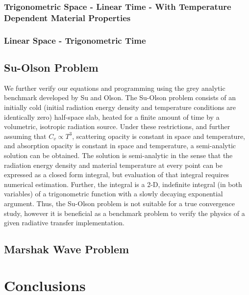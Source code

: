 \subsubsection{Trigonometric Space - Linear Time - With Temperature Dependent Material Properties}

\subsubsection{Linear Space - Trigonometric Time}

\subsection{Su-Olson Problem}

We further verify our equations and programming using the grey analytic benchmark developed by Su and Olson\cite{su_olson_1}.
The Su-Olson problem consists of an initially cold (initial radiation energy density and temperature conditions are identically zero) half-space slab, heated for a finite amount of time by a volumetric, isotropic radiation source.
Under these restrictions, and further assuming that $C_v \propto T^3$, scattering opacity is constant in space and temperature, and absorption opacity is constant in space and temperature, a semi-analytic solution can be obtained.
The solution is semi-analytic in the sense that the radiation energy density and material temperature at every point can be expressed as a closed form integral, but evaluation of that integral requires numerical estimation.
Further, the integral is a 2-D, indefinite integral (in both variables) of a trigonometric function with a slowly  decaying exponential argument.
Thus, the Su-Olson problem is not suitable for a true convergence study, however it is beneficial as a benchmark problem to verify the physics of a given radiative transfer implementation.

\subsection{Marshak Wave Problem}


\section{Conclusions}
\label{sec:chap6_conclusions}


